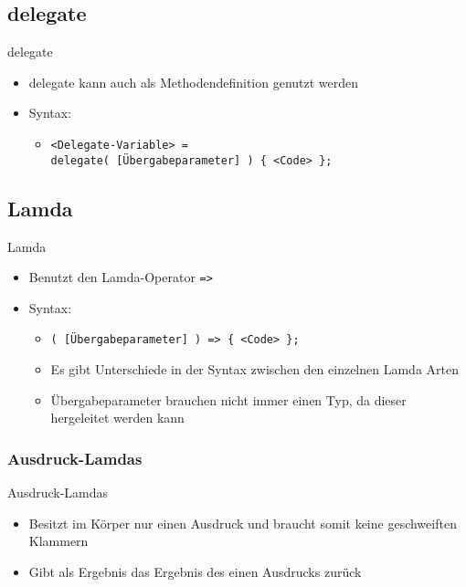 \subsection{delegate}
\begin{frame}{delegate}
	\begin{itemize}
		\item \alert{delegate} kann auch als Methodendefinition genutzt werden
		\item Syntax:
		\begin{itemize}
			\item \texttt{\alert{<Delegate-Variable>} = \\delegate( \alert{[Übergabeparameter]} ) \{ \alert{<Code>} \};}
		\end{itemize}
	\end{itemize}
	
		
\end{frame}

\subsection{Lamda}
\begin{frame}{Lamda}
	\begin{itemize}
		\item Benutzt den Lamda-Operator \alert{\texttt{=>}}
		\item Syntax:
		\begin{itemize}
			\item \texttt{( \alert{[Übergabeparameter]} ) => \{ \alert{<Code>} \};}
			\item Es gibt Unterschiede in der Syntax zwischen den einzelnen Lamda Arten
			\item Übergabeparameter brauchen nicht immer einen Typ, da dieser hergeleitet werden kann
		\end{itemize}
	\end{itemize}
\end{frame}

\subsubsection{Ausdruck-Lamdas}
\begin{frame}{Ausdruck-Lamdas}
	\begin{itemize}
		\item Besitzt im Körper nur einen Ausdruck und braucht somit keine geschweiften Klammern
		\item Gibt als Ergebnis das Ergebnis des einen Ausdrucks zurück
	\end{itemize}
	
		
\end{frame}


